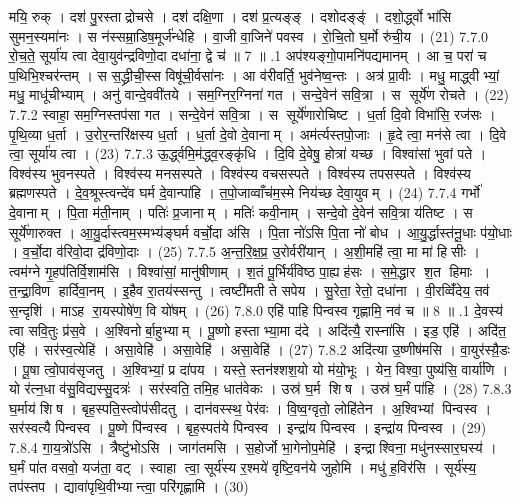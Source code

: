 मयि॒ रुक् । दश॑ पु॒रस्ताद्रोचसे । दश॑ दक्षि॒णा । दश॑ प्र॒त्यङ्ङ् । दशोदङ्ङ्॑ । दशो॒र्द्ध्वो भा॑सि सुमन॒स्यमा॑नः । स न॑स्सम्रा॒डिष॒मूर्ज॑न्धेहि । वा॒जी वा॒जिने॑ पवस्व । रो॒चि॒तो घ॒र्मो रु॑ची॒य । (21)
7.7.0
रो॒च॒ते॒ सूर्या॑य त्वा देवा॒युव॑न्द्रविणो॒दा दधा॑ना॒ द्वे च॑ ॥ 7 ॥
.1
अप॑श्यङ्गो॒पामनि॑पद्यमानम् । आ च॒ परा॑ च प॒थिभि॒श्चर॑न्तम् । स स॒द्ध्रीची॒स्स विषू॑ची॒र्वसा॑नः । आ व॑रीवर्ति॒ भुव॑नेष्व॒न्तः । अत्र॑ प्रा॒वीः । मधु॒ माद्ध्वीभ्यां॒ मधु॒ माधू॑चीभ्याम् । अनु॑ वान्दे॒ववी॑तये । सम॒ग्निर॒ग्निना॑ गत । सन्दे॒वेन॑ सवि॒त्रा । स सूर्ये॑ण रोचते । (22)
7.7.2
स्वाहा॒ सम॒ग्निस्तप॑सा गत । सन्दे॒वेन॑ सवि॒त्रा । स सूर्ये॑णारोचिष्ट । ध॒र्ता दि॒वो विभा॑सि॒ रज॑सः । पृ॒थि॒व्या ध॒र्ता । उ॒रोर॒न्तरि॑क्षस्य ध॒र्ता । ध॒र्ता दे॒वो दे॒वानाम् । अम॑र्त्यस्तपो॒जाः । हृ॒दे त्वा॒ मन॑से त्वा । दि॒वे त्वा॒ सूर्या॑य त्वा । (23)
7.7.3
ऊ॒र्द्ध्वमि॒म॑द्ध्व॒रङ्कृ॑धि । दि॒वि दे॒वेषु॒ होत्रा॑ यच्छ । विश्वा॑सां भुवां पते । विश्व॑स्य भुवनस्पते । विश्व॑स्य मनसस्पते । विश्व॑स्य वचसस्पते । विश्व॑स्य तपसस्पते । विश्व॑स्य ब्रह्मणस्पते । दे॒व॒श्रूस्त्वन्दे॑व घर्म दे॒वान्पा॑हि । त॒पो॒जाव्वाँच॑म॒स्मे निय॑च्छ देवा॒युवम् । (24)
7.7.4
गर्भो॑ दे॒वानाम् । पि॒ता म॑ती॒नाम् । पतिः॑ प्र॒जानाम् । मतिः॑ कवी॒नाम् । सन्दे॒वो दे॒वेन॑ सवि॒त्रा य॑तिष्ट । स सूर्ये॑णारुक्त । आ॒यु॒र्दास्त्वम॒स्मभ्य॑ङ्घर्म वर्चो॒दा अ॑सि । पि॒ता नो॑ऽसि पि॒ता नो॑ बोध । आ॒यु॒र्द्धास्त॑नू॒धाः प॑यो॒धाः । व॒र्चो॒दा व॑रिवो॒दा द्र॑विणो॒दाः । (25)
7.7.5
अ॒न्त॒रि॒क्ष॒प्र॒ उ॒रोर्वरी॑यान् । अ॒शी॒महि॑ त्वा॒ मा मा॑ हिसीः । त्वम॑ग्ने गृ॒हप॑तिर्वि॒शाम॑सि । विश्वा॑सां॒ मानु॑षीणाम् । श॒तं पू॒र्भिर्य॑विष्ठ पा॒ह्यह॑सः । स॒मे॒द्धार श॒त हिमाः । त॒न्द्रा॒विण हार्दिवा॒नम् । इ॒हैव रा॒तय॑स्सन्तु । त्वष्टी॑मती ते सपेय । सु॒रेता॒ रेतो॒ दधा॑ना । वी॒रव्विँ॑देय॒ तव॑ स॒न्दृशि॑ । माऽह रा॒यस्पोषे॑ण॒ वि यो॑षम् । (26)
7.8.0
एहि॑ पाहि पिन्वस्व गृह्णामि॒ नव॑ च ॥ 8 ॥
.1
दे॒वस्य॑ त्वा सवि॒तुः प्र॑स॒वे । अ॒श्विनोर्बा॒हुभ्याम् । पू॒ष्णो हस्ताभ्या॒मा द॑दे । अदि॑त्यै॒ रास्ना॑सि । इड॒ एहि॑ । अदि॑त॒ एहि॑ । सर॑स्व॒त्येहि॑ । असा॒वेहि॑ । असा॒वेहि॑ । असा॒वेहि॑ । (27)
7.8.2
अदि॑त्या उ॒ष्णीष॑मसि । वा॒युर॑स्यै़॒डः । पू॒षा त्वो॒पाव॑सृजतु । अ॒श्विभ्यां॒ प्र दा॑पय । यस्ते॒ स्तन॑श्शश॒यो यो म॑यो॒भूः । येन॒ विश्वा॒ पुष्य॑सि॒ वार्या॑णि । यो र॑त्न॒धा व॑सु॒विद्यस्सु॒दत्रः॑ । सर॑स्वति॒ तमि॒ह धात॑वेकः । उस्र॑ घ॒र्म शिष । उस्र॑ घ॒र्मं पा॑हि । (28)
7.8.3
घ॒र्माय॑ शिष । बृह॒स्पति॒स्त्वोप॑सीदतु । दान॑वस्स्थ॒ पेर॑वः । वि॒ष्व॒ग्वृतो॒ लोहि॑तेन । अ॒श्विभ्यां पिन्वस्व । सर॑स्वत्यै पिन्वस्व । पू॒ष्णे पि॑न्वस्व । बृह॒स्पत॑ये पिन्वस्व । इन्द्रा॑य पिन्वस्व । इन्द्रा॑य पिन्वस्व । (29)
7.8.4
गा॒य॒त्रो॑ऽसि । त्रैष्टु॑भोऽसि । जाग॑तमसि । स॒होर्जो भा॒गेनोप॒मेहि॑ । इन्द्राश्विना॒ मधु॑नस्सार॒घस्य॑ । घ॒र्मं पा॑त वसवो॒ यज॑ता॒ वट् । स्वाहा त्वा॒ सूर्य॑स्य र॒श्मये॑ वृष्टि॒वन॑ये जुहोमि । मधु॑ ह॒विर॑सि । सूर्य॑स्य॒ तप॑स्तप । द्यावा॑पृथि॒वीभ्यान्त्वा॒ परि॑गृह्णामि । (30)
